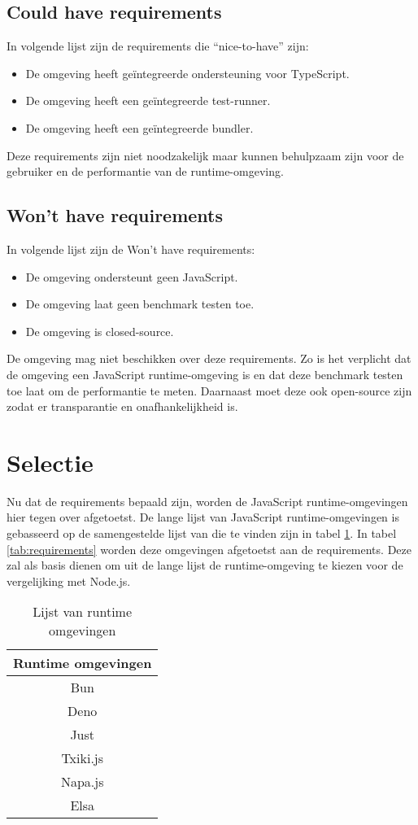 \subsection{Could have requirements}
In volgende lijst zijn de requirements die “nice-to-have” zijn:
\begin{itemize}
    \item De omgeving heeft geïntegreerde ondersteuning voor TypeScript.
    \item De omgeving heeft een geïntegreerde test-runner.
    \item De omgeving heeft een geïntegreerde bundler.
\end{itemize}
Deze requirements zijn niet noodzakelijk maar kunnen behulpzaam zijn voor de gebruiker en de performantie van de runtime-omgeving.

\subsection{Won't have requirements}
In volgende lijst zijn de Won't have requirements:
\begin{itemize}
    \item De omgeving ondersteunt geen JavaScript.
    \item De omgeving laat geen benchmark testen toe. 
    \item De omgeving is closed-source.
\end{itemize}
De omgeving mag niet beschikken over deze requirements. 
Zo is het verplicht dat de omgeving een JavaScript runtime-omgeving is en dat deze benchmark testen toe laat om de performantie te meten.
Daarnaast moet deze ook open-source zijn zodat er transparantie en onafhankelijkheid is.

\section{Selectie}
Nu dat de requirements bepaald zijn, worden de JavaScript runtime-omgevingen hier tegen over afgetoetst.
De lange lijst van JavaScript runtime-omgevingen is gebasseerd op de samengestelde lijst van \textcite{Errilaz2023} 
die te vinden zijn in tabel \ref{tab:omgevingen}.
In tabel \ref{tab:requirements} worden deze omgevingen afgetoetst aan de requirements. 
Deze zal als basis dienen om uit de lange lijst de runtime-omgeving te kiezen voor de vergelijking met Node.js.
\begin{table}[H]
    \begin{tabular}{|c|}
    \hline
    \textbf{Runtime omgevingen} \\ \hline
    Bun                         \\
    Deno                        \\
    Just                        \\
    Txiki.js                    \\
    Napa.js                     \\
    Elsa                        \\ \hline
    \end{tabular}
    \caption{\label{tab:omgevingen}Lijst van runtime omgevingen}
\end{table}


